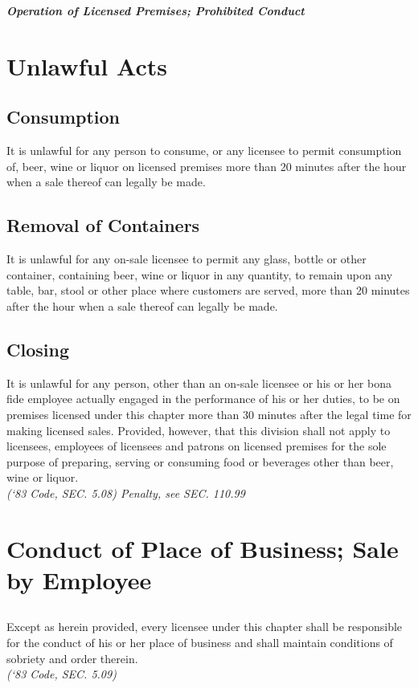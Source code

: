 \begin{center}
    \emph{\textbf{\LARGE{Operation of Licensed Premises; Prohibited Conduct}}}
\end{center}

\setcounter{section}{39}
\section{Unlawful Acts}
\subsection{Consumption}
It is unlawful for any person to consume, or any licensee to permit consumption of, beer, wine or liquor on licensed premises more than 20 minutes after the hour when a sale thereof can legally be made.
\subsection{Removal of Containers}
It is unlawful for any on-sale licensee to permit any glass, bottle or other container, containing beer, wine or liquor in any quantity, to remain upon any table, bar, stool or other place where customers are served, more than 20 minutes after the hour when a sale thereof can legally be made.
\subsection{Closing}
It is unlawful for any person, other than an on-sale licensee or his or her bona fide employee actually engaged in the performance of his or her duties, to be on premises licensed under this chapter more than 30 minutes after the legal time for making licensed sales.  Provided, however, that this division shall not apply to licensees, employees of licensees and patrons on licensed premises for the sole purpose of preparing, serving or consuming food or beverages other than beer, wine or liquor.\\
\emph{(‘83 Code, SEC. 5.08)  Penalty, see SEC. 110.99}
\section{Conduct of Place of Business; Sale by Employee}
\subsection{}
Except as herein provided, every licensee under this chapter shall be responsible for the conduct of his or her place of business and shall maintain conditions of sobriety and order therein.\\
\emph{(‘83 Code, SEC. 5.09)}
